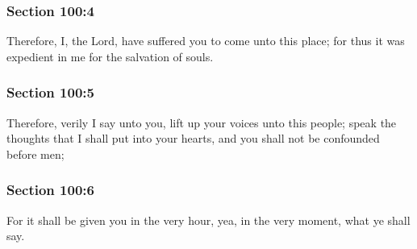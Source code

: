 	\subsubsection{Section 100:4} %
		\label{DC100-4}

		Therefore, I, the Lord, have suffered you to come unto this place; for thus it was expedient in me for the salvation of souls.


	\subsubsection{Section 100:5} %
		\label{DC100-5}

		Therefore, verily I say unto you, lift up your voices unto this people; speak the thoughts that I shall put into your hearts, and you shall not be confounded before men;


	\subsubsection{Section 100:6} %
		\label{DC100-6}

		For it shall be given you in the very hour, yea, in the very moment, what ye shall say.


